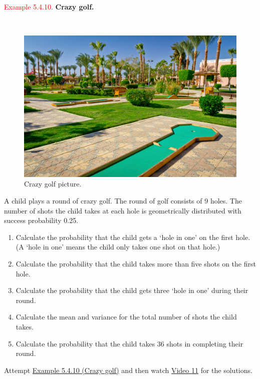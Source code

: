 \documentclass[
]{book}
\providecommand{\tightlist}{%
  \setlength{\itemsep}{0pt}\setlength{\parskip}{0pt}}
\begin{document}
\hypertarget{rv:exer:crazy_golf}{}
\textcolor{red}{Example 5.4.10.}
{\textbf{Crazy golf.}}\\
\strut \\

\begin{figure}
\includegraphics[width=0.8\linewidth]{Images/crazygolf1} \caption{Crazy golf picture.}\label{fig:golf1}
\end{figure}

A child plays a round of crazy golf. The round of golf consists of 9 holes. The number of shots the child takes at each
hole is geometrically distributed with success probability 0.25.

\begin{enumerate}
\def\labelenumi{(\alph{enumi})}
\tightlist
\item
  Calculate the probability that the child gets a `hole in
  one' on the first hole. (A `hole in one' means the child only takes
  one shot on that hole.)\\
\item
  Calculate the probability that the child takes more than five shots on the first hole.\\
\item
  Calculate the probability that the child gets three `hole in one' during their round.
\item
  Calculate the mean and variance for the total number of shots the child takes.\\
\item
  Calculate the probability that the child takes 36 shots in completing their round.\\
\end{enumerate}

Attempt \protect\hyperlink{rv:exer:crazy_golf}{Example 5.4.10 (Crazy golf)} and then watch \protect\hyperlink{video11}{Video 11} for the solutions.
\end{document}
